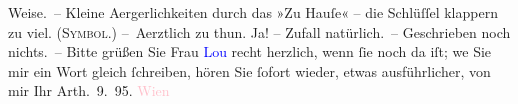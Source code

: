                Weise. – Kleine Aergerlichkeiten durch das »Zu Hauſe« – die Schlüſſel {\pb}klappern zu viel. (\textsc{Symbol}.)\pend
           \pstart
           – Aerztlich zu thun. Ja! – Zufall natürlich. –\pend
           \pstart
           Geschrieben noch nichts. –\pend
           \pstart
           Bitte grüßen Sie Frau \textcolor{blue}{Lou}{}\ledrightnote{\textcolor{blue}{Lou Andreas-Salomé}} recht herzlich, wenn
               ſie noch da iſt; we{\geminationn}
               Sie mir ein Wort gleich ſchreiben, {\pb}hören Sie ſofort wieder, etwas ausführlicher, von
               mir\pend
           \pstart Ihr \spacefill\mbox{Arth}\pend{}. 9. 95. \textcolor{pink}{Wien}{}\ledrightnote{\textcolor{pink}{Wien}}\pend
           \endnumbering{}  
      